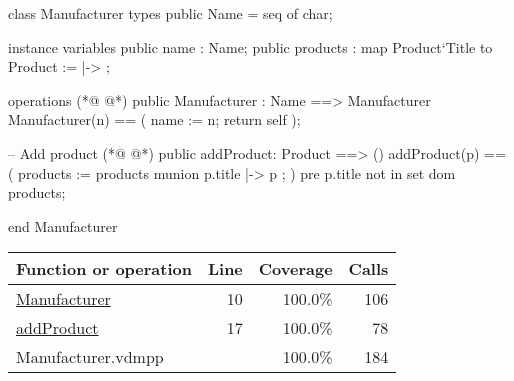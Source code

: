 \begin{vdmpp}[breaklines=true]
class Manufacturer
types
 public Name = seq of char;
 
instance variables
 public name : Name;
 public products : map Product`Title to Product := { |-> };
 
operations
(*@
\label{Manufacturer:10}
@*)
 public Manufacturer : Name ==> Manufacturer
 Manufacturer(n) == (
  name := n;
   return self
 );
 
 -- Add product
(*@
\label{addProduct:17}
@*)
 public addProduct: Product ==> ()
 addProduct(p) == (
  products := products munion { p.title |-> p };
 )
 pre p.title not in set dom products;

end Manufacturer
\end{vdmpp}
\bigskip
\begin{longtable}{|l|r|r|r|}
\hline
Function or operation & Line & Coverage & Calls \\
\hline
\hline
\hyperref[Manufacturer:10]{Manufacturer} & 10&100.0\% & 106 \\
\hline
\hyperref[addProduct:17]{addProduct} & 17&100.0\% & 78 \\
\hline
\hline
Manufacturer.vdmpp & & 100.0\% & 184 \\
\hline
\end{longtable}

